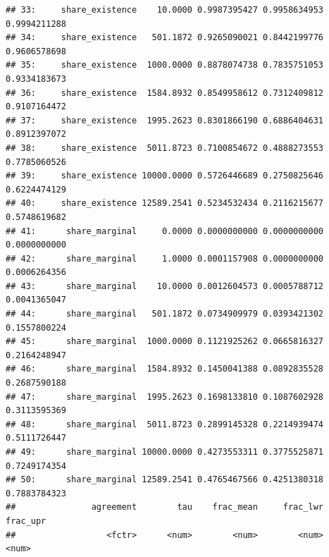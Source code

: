\documentclass[
  11pt,
]{article}
\begin{document}
\begin{verbatim}
## 33:     share_existence    10.0000 0.9987395427 0.9958634953 0.9994211288
## 34:     share_existence   501.1872 0.9265090021 0.8442199776 0.9606578698
## 35:     share_existence  1000.0000 0.8878074738 0.7835751053 0.9334183673
## 36:     share_existence  1584.8932 0.8549958612 0.7312409812 0.9107164472
## 37:     share_existence  1995.2623 0.8301866190 0.6886404631 0.8912397072
## 38:     share_existence  5011.8723 0.7100854672 0.4888273553 0.7785060526
## 39:     share_existence 10000.0000 0.5726446689 0.2750825646 0.6224474129
## 40:     share_existence 12589.2541 0.5234532434 0.2116215677 0.5748619682
## 41:      share_marginal     0.0000 0.0000000000 0.0000000000 0.0000000000
## 42:      share_marginal     1.0000 0.0001157908 0.0000000000 0.0006264356
## 43:      share_marginal    10.0000 0.0012604573 0.0005788712 0.0041365047
## 44:      share_marginal   501.1872 0.0734909979 0.0393421302 0.1557800224
## 45:      share_marginal  1000.0000 0.1121925262 0.0665816327 0.2164248947
## 46:      share_marginal  1584.8932 0.1450041388 0.0892835528 0.2687590188
## 47:      share_marginal  1995.2623 0.1698133810 0.1087602928 0.3113595369
## 48:      share_marginal  5011.8723 0.2899145328 0.2214939474 0.5111726447
## 49:      share_marginal 10000.0000 0.4273553311 0.3775525871 0.7249174354
## 50:      share_marginal 12589.2541 0.4765467566 0.4251380318 0.7883784323
##               agreement        tau    frac_mean     frac_lwr     frac_upr
##                  <fctr>      <num>        <num>        <num>        <num>
\end{verbatim}
\end{document}
